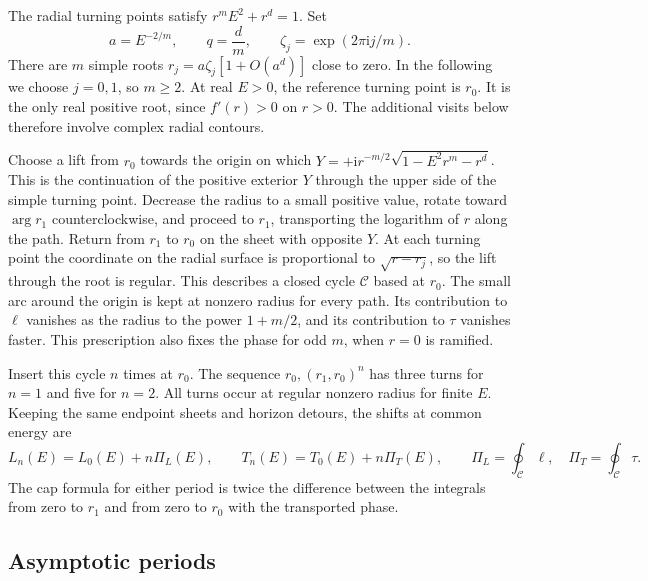 \documentclass[11pt,a4paper]{article}
\newcommand{\ii}{\mathrm{i}}
\begin{document}
The radial turning points satisfy \(r^m E^2+r^d=1\). Set
\begin{equation}
 a=E^{-2/m},\qquad q=\frac{d}{m},\qquad
 \zeta_j=\exp(2\pi\ii j/m).
\end{equation}
There are \(m\) simple roots \(r_j=a\zeta_j[1+O(a^d)]\) close to zero. In the following we choose \(j=0,1\), so \(m\geq2\). At real \(E>0\), the reference turning point is \(r_0\). It is the only real positive root, since \(f'(r)>0\) on \(r>0\). The additional visits below therefore involve complex radial contours.

Choose a lift from \(r_0\) towards the origin on which \(Y=+\ii r^{-m/2}\sqrt{1-E^2r^m-r^d}\). This is the continuation of the positive exterior \(Y\) through the upper side of the simple turning point. Decrease the radius to a small positive value, rotate toward \(\arg r_1\) counterclockwise, and proceed to \(r_1\), transporting the logarithm of \(r\) along the path. Return from \(r_1\) to \(r_0\) on the sheet with opposite \(Y\). At each turning point the coordinate on the radial surface is proportional to \(\sqrt{r-r_j}\), so the lift through the root is regular. This describes a closed cycle \(\mathcal C\) based at \(r_0\). The small arc around the origin is kept at nonzero radius for every path. Its contribution to \(\ell\) vanishes as the radius to the power \(1+m/2\), and its contribution to \(\tau\) vanishes faster. This prescription also fixes the phase for odd \(m\), when \(r=0\) is ramified.

Insert this cycle \(n\) times at \(r_0\). The sequence \(r_0,(r_1,r_0)^n\) has three turns for \(n=1\) and five for \(n=2\). All turns occur at regular nonzero radius for finite \(E\). Keeping the same endpoint sheets and horizon detours, the shifts at common energy are
\begin{equation}
 L_n(E)=L_0(E)+n\Pi_L(E),\qquad
 T_n(E)=T_0(E)+n\Pi_T(E),\qquad
 \Pi_L=\oint_{\mathcal C}\ell,\quad \Pi_T=\oint_{\mathcal C}\tau .
 \label{eq:add}
\end{equation}
The cap formula for either period is twice the difference between the integrals from zero to \(r_1\) and from zero to \(r_0\) with the transported phase.

\subsection{Asymptotic periods}
\label{sec:periods}
\end{document}

